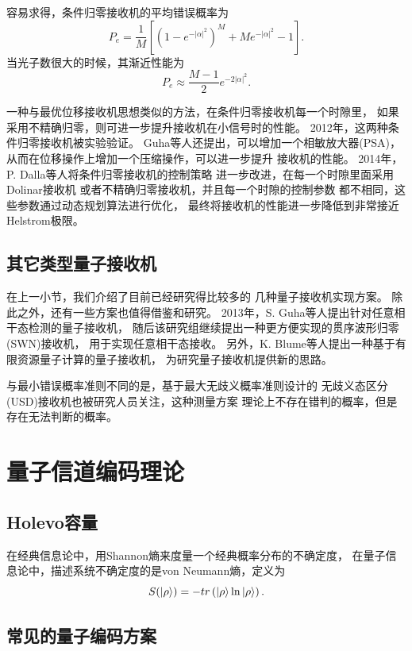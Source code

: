 容易求得，条件归零接收机的平均错误概率为\cite{guha2011approaching,dolinar1982near}
\begin{equation}
P_e = \frac{1}{M}[(1-e^{-|\alpha|^2})^M + M e^{-|\alpha|^2} - 1].
\end{equation}
当光子数很大的时候，其渐近性能为
\begin{equation}
P_e \approx \frac{M-1}{2} e^{-2|\alpha|^2}.
\end{equation}

一种与最优位移接收机思想类似的方法，在条件归零接收机每一个时隙里，
如果采用不精确归零，则可进一步提升接收机在小信号时的性能\cite{guha2011approaching}。
2012年，这两种条件归零接收机被实验验证\cite{chen2012optical}。
Guha等人还提出，可以增加一个相敏放大器(PSA)，
从而在位移操作上增加一个压缩操作，可以进一步提升
接收机的性能\cite{guha2011approaching}。
2014年，P. Dalla等人将条件归零接收机的控制策略
进一步改进，在每一个时隙里面采用Dolinar接收机
或者不精确归零接收机，并且每一个时隙的控制参数
都不相同，这些参数通过动态规划算法进行优化，
最终将接收机的性能进一步降低到非常接近Helstrom极限\cite{dalla2014adaptive}。



\subsection{其它类型量子接收机}
在上一小节，我们介绍了目前已经研究得比较多的
几种量子接收机实现方案。
除此之外，还有一些方案也值得借鉴和研究。
2013年，S. Guha等人提出针对任意相干态检测的量子接收机\cite{da2013achieving}，
随后该研究组继续提出一种更方便实现的贯序波形归零(SWN)接收机，
用于实现任意相干态接收\cite{nair2014realizable}。
另外，K. Blume等人提出一种基于有限资源量子计算的量子接收机\cite{blume2012ideal}，
为研究量子接收机提供新的思路。

与最小错误概率准则不同的是，基于最大无歧义概率准则设计的
无歧义态区分(USD)接收机也被研究人员关注，这种测量方案
理论上不存在错判的概率，但是存在无法判断的概率\cite{becerra2013implementation}。



\section{量子信道编码理论}

\subsection{Holevo容量}
在经典信息论中，用Shannon熵来度量一个经典概率分布的不确定度\cite{jd2001xxlybm}，
在量子信息论中，描述系统不确定度的是von Neumann熵，定义为\cite{nielsen2005qcqi,nielsen2010quantum}
\begin{equation}
S(\ket{\rho}) = -tr\left( \ket{\rho} \ln \ket{\rho}\right).
\end{equation}






\subsection{常见的量子编码方案}





